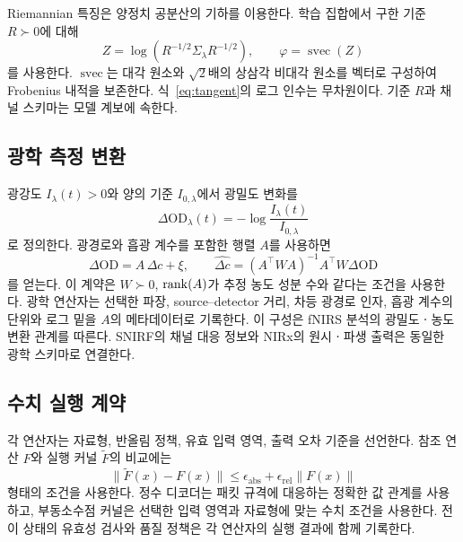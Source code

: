 Riemannian 특징은 양정치 공분산의 기하를 이용한다\cite{riemannian}.
학습 집합에서 구한 기준 $R\succ0$에 대해
\begin{equation}
 Z=\log(R^{-1/2}\Sigma_\lambda R^{-1/2}),\qquad
 \varphi=\operatorname{svec}(Z)
 \label{eq:tangent}
\end{equation}
를 사용한다. $\operatorname{svec}$는 대각 원소와 $\sqrt2$배의 상삼각 비대각 원소를
벡터로 구성하여 Frobenius 내적을 보존한다. 식~\eqref{eq:tangent}의 로그 인수는 무차원이다.
기준 $R$과 채널 스키마는 모델 계보에 속한다.

\subsection{광학 측정 변환}
광강도 $I_\lambda(t)>0$와 양의 기준 $I_{0,\lambda}$에서 광밀도 변화를
\begin{equation}
 \Delta\mathrm{OD}_\lambda(t)
 =-\log\frac{I_\lambda(t)}{I_{0,\lambda}}
\end{equation}
로 정의한다. 광경로와 흡광 계수를 포함한 행렬 $A$를 사용하면
\begin{equation}
 \Delta\mathrm{OD}=A\,\Delta c+\xi,
 \qquad
 \widehat{\Delta c}=(A^\top WA)^{-1}A^\top W\Delta\mathrm{OD}
 \label{eq:mbll}
\end{equation}
를 얻는다. 이 계약은 $W\succ0$, $\operatorname{rank}(A)$가 추정 농도 성분 수와 같다는 조건을 사용한다.
광학 연산자는 선택한 파장, source--detector 거리, 차등 광경로 인자,
흡광 계수의 단위와 로그 밑을 $A$의 메타데이터로 기록한다.
이 구성은 fNIRS 분석의 광밀도ㆍ농도 변환 관계를 따른다\cite{homer}.
SNIRF의 채널 대응 정보와 NIRx의 원시ㆍ파생 출력은 동일한 광학 스키마로 연결한다\cite{snirf,nirx_formats}.

\subsection{수치 실행 계약}
각 연산자는 자료형, 반올림 정책, 유효 입력 영역, 출력 오차 기준을 선언한다.
참조 연산 $F$와 실행 커널 $\widetilde F$의 비교에는
\begin{equation}
 \lVert\widetilde F(x)-F(x)\rVert
 \le\epsilon_{\mathrm{abs}}+\epsilon_{\mathrm{rel}}\lVert F(x)\rVert
 \label{eq:numeric}
\end{equation}
형태의 조건을 사용한다. 정수 디코더는 패킷 규격에 대응하는 정확한 값 관계를 사용하고,
부동소수점 커널은 선택한 입력 영역과 자료형에 맞는 수치 조건을 사용한다.
전이 상태의 유효성 검사와 품질 정책은 각 연산자의 실행 결과에 함께 기록한다.
